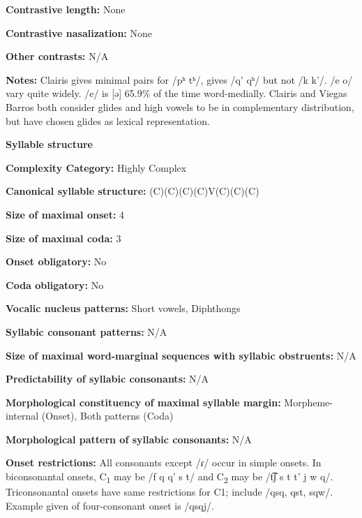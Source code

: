 \textbf{Contrastive length:} None



\textbf{Contrastive nasalization:} None



\textbf{Other contrasts:} N/A



\textbf{Notes:} Clairis gives minimal pairs for /pʰ tʰ/, gives /q’ qʰ/ but not /k k’/. /e o/ vary quite widely. /e/ is [ə] 65.9\% of the time word-medially. Clairis and Viegas Barros both consider glides and high vowels to be in complementary distribution, but have chosen glides as lexical representation.



\textbf{Syllable structure}



\textbf{Complexity Category:} Highly Complex



\textbf{Canonical syllable structure:} (C)(C)(C)(C)V(C)(C)(C) \citep[391-401]{Clairis1985}



\textbf{Size of maximal onset:} 4



\textbf{Size of maximal coda:} 3



\textbf{Onset obligatory:} No



\textbf{Coda obligatory:} No



\textbf{Vocalic nucleus patterns:} Short vowels, Diphthongs



\textbf{Syllabic consonant patterns:} N/A



\textbf{Size of maximal word{}-marginal sequences with syllabic obstruents:} N/A



\textbf{Predictability of syllabic consonants:} N/A 



\textbf{Morphological constituency of maximal syllable margin:} Morpheme-internal (Onset), Both patterns (Coda)



\textbf{Morphological pattern of syllabic consonants:} N/A



\textbf{Onset restrictions:} All consonants except /ɾ/ occur in simple onsets. In biconsonantal onsets, C\textsubscript{1} may be /f q q' s t/ and C\textsubscript{2} may be /t͡ʃ s t t' j w q/. Triconsonantal onsets have same restrictions for C1; include /qsq, qst, sqw/. Example given of four-consonant onset is /qsqj/.



